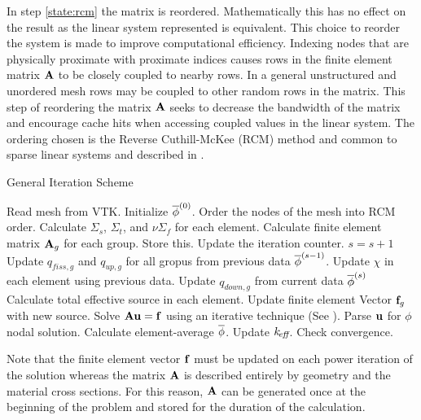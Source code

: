     In step \ref{state:rcm} the matrix is reordered. Mathematically this has no
    effect on the result as the linear system represented is equivalent. This 
    choice to reorder the system is made to improve computational efficiency. 
    Indexing nodes that are physically proximate with proximate indices causes 
    rows in the finite element matrix $\mathbf{A}$ to be closely coupled to nearby
    rows. In a general unstructured and unordered mesh rows may be coupled to 
    other random rows in the matrix. This step of reordering the matrix $\mathbf{A}$ 
    seeks to decrease the bandwidth of the matrix and encourage cache hits when
    accessing coupled values in the linear system. The ordering chosen is the
    Reverse Cuthill-McKee (RCM) method and common to sparse linear systems and 
    described in \cite{rcm}.
    
    \begin{algorithm}
      \caption{General Iteration Scheme}
      \label{algorithm:general}
      \begin{algorithmic}[1]
      \State Read mesh from VTK.
      \State Initialize $\overline{\phi}^{(0)}$.
      \State Order the nodes of the mesh into RCM order.
        \label{state:rcm}
      \State Calculate $\Sigma_s$, $\Sigma_t$, and $\nu \Sigma_f$ for each 
        element.
      \State Calculate finite element matrix $\mathbf{A}_g$ for each group. Store this. 
        \label{state:fem_matrix}
        \State Update the iteration counter. $s=s+1$
        \State Update $q_{fiss,g}$ and $q_{up,g}$ for all gropus from previous 
          data $\overline{\phi}^{(s-1)}$.
        \State Update $\chi$ in each element using previous data.
          \State Update $q_{down,g}$ from current data $\overline{\phi}^{(s)}$
          \State Calculate total effective source in each element.
          \State Update finite element Vector $\mathbf{f}_g$ with new source.
            \label{state:fem_vector}
          \State Solve $\mathbf{A} \mathbf{u} = \mathbf{f}$ using an iterative technique (See
            ).
          \State Parse $\mathbf{u}$ for $\phi$ nodal solution.
          \State Calculate element-average $\overline{\phi}$.
        \EndFor
        \State Update $k_{\!\mbox{\scriptsize \em eff}}$.
        \State Check convergence.
      \EndWhile
      \end{algorithmic}
    \end{algorithm}
    
    Note that the finite element vector $\mathbf{f}$ must be updated on each power
    iteration of the solution whereas the matrix $\mathbf{A}$ is described entirely by 
    geometry and the material cross sections. For this reason, $\mathbf{A}$ can be 
    generated once at the beginning of the problem and stored for the duration 
    of the calculation.
    \FloatBarrier %

